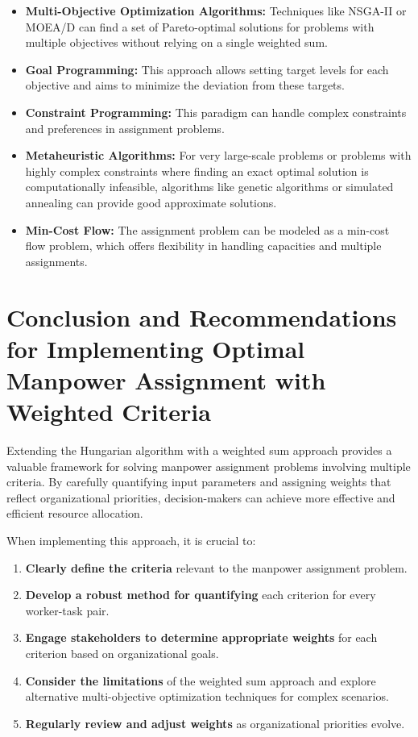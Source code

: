 \documentclass{article}
\begin{document}
\begin{itemize}
    \item \textbf{Multi-Objective Optimization Algorithms:} Techniques like NSGA-II or MOEA/D can find a set of Pareto-optimal solutions for problems with multiple objectives without relying on a single weighted sum.
    \item \textbf{Goal Programming:} This approach allows setting target levels for each objective and aims to minimize the deviation from these targets.
    \item \textbf{Constraint Programming:} This paradigm can handle complex constraints and preferences in assignment problems.
    \item \textbf{Metaheuristic Algorithms:} For very large-scale problems or problems with highly complex constraints where finding an exact optimal solution is computationally infeasible, algorithms like genetic algorithms or simulated annealing can provide good approximate solutions.
    \item \textbf{Min-Cost Flow:} The assignment problem can be modeled as a min-cost flow problem, which offers flexibility in handling capacities and multiple assignments.
\end{itemize}

\section{Conclusion and Recommendations for Implementing Optimal Manpower Assignment with Weighted Criteria}

Extending the Hungarian algorithm with a weighted sum approach provides a valuable framework for solving manpower assignment problems involving multiple criteria. By carefully quantifying input parameters and assigning weights that reflect organizational priorities, decision-makers can achieve more effective and efficient resource allocation.

When implementing this approach, it is crucial to:

\begin{enumerate}
    \item \textbf{Clearly define the criteria} relevant to the manpower assignment problem.
    \item \textbf{Develop a robust method for quantifying} each criterion for every worker-task pair.
    \item \textbf{Engage stakeholders to determine appropriate weights} for each criterion based on organizational goals.
    \item \textbf{Consider the limitations} of the weighted sum approach and explore alternative multi-objective optimization techniques for complex scenarios.
    \item \textbf{Regularly review and adjust weights} as organizational priorities evolve.
\end{enumerate}




\end{document}
